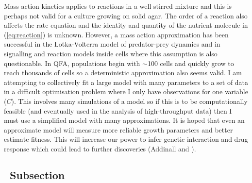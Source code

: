 Mass action kinetics applies to reactions in a well stirred mixture
and this is perhaps not valid for a culture growing on solid agar. The
order of a reaction also affects the rate equation and the identity
and quantity of the nutrient molecule in (\ref{eq:reaction}) is
unknown. However, a mass action approximation has been successful in
the Lotka-Volterra model of predator-prey dynamics
\citep{Berryman1992} and in signalling and reaction models inside
cells \citep{Aldridge2006,Chen2010} where this assumption is also
questionable. In QFA, populations begin with \(\sim\)100 cells and
quickly grow to reach thousands of cells so a deterministic
approximation also seems valid. I am attempting to collectively fit a
large model with many parameters to a set of data in a difficult
optimisation problem where I only have observations for one variable
(\(C\)). This involves many simulations of a model so if this is to be
computationally feasible (and eventually used in the analysis of
high-throughput data) then I must use a simplified model with many
approximations. It is hoped that even an approximate model will
measure more reliable growth parameters and better estimate
fitness. This will increase our power to infer genetic interaction and
drug response which could lead to further discoveries (Addinall and ).








\subsection{\thesubsection~Subsection}




